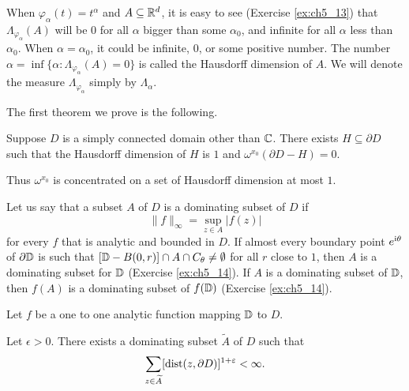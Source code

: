 When $\varphi_\alpha(t) = t^\alpha$ and $A \subseteq \mathbb{R}^d$, it is easy to see (Exercise \ref{ex:ch5_13}) that $\Lambda_{\varphi_\alpha}(A)$ will be $0$ for all $\alpha$ bigger than some $\alpha_0$, and infinite for all $\alpha$ less than $\alpha_0$. When $\alpha = \alpha_0$, it could be infinite, $0$, or some positive number. The number $\alpha = \inf\{\alpha : \Lambda_{\varphi_\alpha}(A) = 0\}$ is called the Hausdorff dimension of $A$. We will denote the measure $\Lambda_{\varphi_\alpha}$ simply by $\Lambda_\alpha$.

The first theorem we prove is the following.


\begin{theorem}\label{thm:ch5_4.6}
Suppose $D$ is a simply connected domain other than $\mathbb{C}$. There exists $H \subseteq \partial D$ such that the Hausdorff dimension of $H$ is $1$ and $\omega^{x_0}(\partial D - H) = 0$.
\end{theorem}

Thus $\omega^{x_0}$ is concentrated on a set of Hausdorff dimension at most $1$.

Let us say that a subset $A$ of $D$ is a dominating subset of $D$ if
\[
    \|f\|_\infty = \sup_{z\in A}|f(z)|
\]
for every $f$ that is analytic and bounded in $D$. If almost every boundary point $e^{\mathrm{i}\theta}$ of $\partial\mathbb{D}$ is such that $[\mathbb{D} - B(0,r)] \cap A \cap C_\theta \neq \emptyset$ for all $r$ close to $1$, then $A$ is a dominating subset for $\mathbb{D}$ (Exercise \ref{ex:ch5_14}). If $A$ is a dominating subset of $\mathbb{D}$, then $f(A)$ is a dominating subset of $f(\mathbb{D})$ (Exercise \ref{ex:ch5_14}).

Let $f$ be a one to one analytic function mapping $\mathbb{D}$ to $D$.

\begin{lemma}\label{lem:ch5_4.7}
Let $\epsilon > 0$. There exists a dominating subset $\widetilde{A}$ of $D$ such that
\[
    \sum_{z\in\widetilde{A}}[\operatorname{dist}(z,\partial D)]^{1+\varepsilon} < \infty.
\]
\end{lemma}

